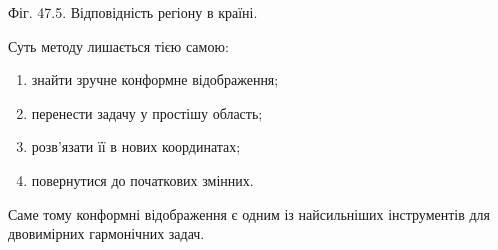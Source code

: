 \documentclass[
  ukrainian,
]{article}
\providecommand{\tightlist}{%
  \setlength{\itemsep}{0pt}\setlength{\parskip}{0pt}}
\begin{document}
Фіг. 47.5. Відповідність регіону в країні.

Суть методу лишається тією самою:

\begin{enumerate}
\def\labelenumi{\arabic{enumi}.}
\tightlist
\item
  знайти зручне конформне відображення;
\item
  перенести задачу у простішу область;
\item
  розв'язати її в нових координатах;
\item
  повернутися до початкових змінних.
\end{enumerate}

Саме тому конформні відображення є одним із найсильніших інструментів
для двовимірних гармонічних задач.
\end{document}
